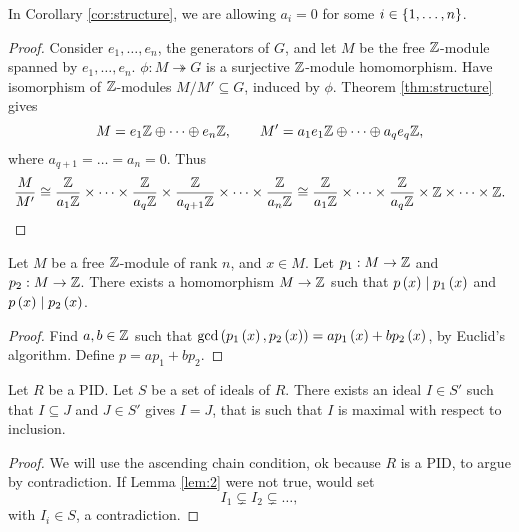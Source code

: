 
\begin{remark*}
In Corollary \ref{cor:structure}, we are allowing $ a_i = 0 $ for some $ i \in \left\{ 1, \dots, n \right\} $.
\end{remark*}

\begin{proof}
Consider $ e_1, \dots, e_n $, the generators of $ G $, and let $ M $ be the free $ \mathbb{Z} $-module spanned by $ e_1, \dots, e_n $. $ \phi : M \twoheadrightarrow G $ is a surjective $ \mathbb{Z} $-module homomorphism. Have isomorphism of $ \mathbb{Z} $-modules $ M / M' \subseteq G $, induced by $ \phi $. Theorem \ref{thm:structure} gives
$$ M = e_1\mathbb{Z} \oplus \dots \oplus e_n\mathbb{Z}, \qquad M' = a_1e_1\mathbb{Z} \oplus \dots \oplus a_qe_q\mathbb{Z}, $$
where $ a_{q + 1} = \dots = a_n = 0 $. Thus
$$ \dfrac{M}{M'} \cong \dfrac{\mathbb{Z}}{a_1\mathbb{Z}} \times \dots \times \dfrac{\mathbb{Z}}{a_q\mathbb{Z}} \times \dfrac{\mathbb{Z}}{a_{q + 1}\mathbb{Z}} \times \dots \times \dfrac{\mathbb{Z}}{a_n\mathbb{Z}} \cong \dfrac{\mathbb{Z}}{a_1\mathbb{Z}} \times \dots \times \dfrac{\mathbb{Z}}{a_q\mathbb{Z}} \times \mathbb{Z} \times \dots \times \mathbb{Z}. $$
\end{proof}

\begin{lemma}
\label{lem:1}
Let $ M $ be a free $ \mathbb{Z} $-module of rank $ n $, and $ x \in M $. Let $ p_1 : M \to \mathbb{Z} $ and $ p_2 : M \to \mathbb{Z} $. There exists a homomorphism $ M \to \mathbb{Z} $ such that $ p\left( x \right) \mid p_1\left( x \right) $ and $ p\left( x \right) \mid p_2\left( x \right) $.
\end{lemma}

\begin{proof}
Find $ a, b \in \mathbb{Z} $ such that $ \gcd\left( p_1\left( x \right), p_2\left( x \right) \right) = ap_1\left( x \right) + bp_2\left( x \right) $, by Euclid's algorithm. Define $ p = ap_1 + bp_2 $.
\end{proof}

\pagebreak

\begin{lemma}
\label{lem:2}
Let $ R $ be a PID. Let $ S $ be a set of ideals of $ R $. There exists an ideal $ I \in S' $ such that $ I \subseteq J $ and $ J \in S' $ gives $ I = J $, that is such that $ I $ is maximal with respect to inclusion.
\end{lemma}

\begin{proof}
We will use the ascending chain condition, ok because $ R $ is a PID, to argue by contradiction. If Lemma \ref{lem:2} were not true, would set
$$ I_1 \subsetneq I_2 \subsetneq \dots, $$
with $ I_i \in S $, a contradiction.
\end{proof}


